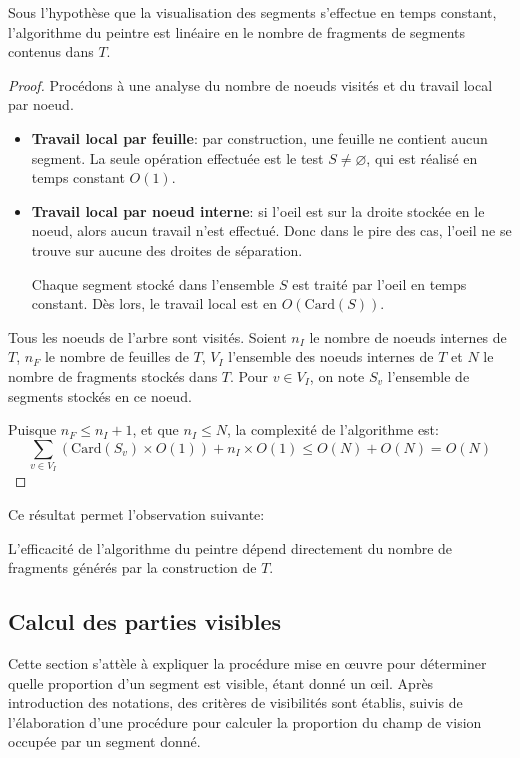 \begin{prop}\label{compl:painter}
  Sous l'hypothèse que la visualisation des segments s'effectue
  en temps constant, l'algorithme du peintre est linéaire en le
  nombre de fragments de segments contenus dans $T$.
\end{prop}
\begin{proof}
  Procédons à une analyse du nombre de noeuds visités et du travail local
  par noeud.
  \begin{itemize}
  \item \textbf{Travail local par feuille}: par construction, une feuille
    ne contient aucun segment. La seule opération effectuée est le test
    $S\neq \varnothing$, qui est réalisé en temps constant $O(1)$.
  \item \textbf{Travail local par noeud interne}: si l'oeil est sur la droite
    stockée en le noeud, alors aucun travail n'est effectué. Donc dans le
    pire des cas, l'oeil ne se trouve sur aucune des droites de séparation.

    Chaque segment stocké dans l'ensemble $S$ est traité par l'oeil en
    temps constant. Dès lors, le travail local est en $O(\mathrm{Card}(S))$.
  \end{itemize}
  Tous les noeuds de l'arbre sont visités. Soient $n_I$ le nombre de noeuds
  internes de $T$, $n_F$ le nombre de feuilles de $T$, $V_I$ l'ensemble des
  noeuds internes de $T$ et $N$ le nombre
  de fragments stockés dans $T$.
  Pour $v\in V_I$, on note $S_v$ l'ensemble de segments stockés en ce noeud.

  Puisque $n_F \leq n_I + 1$, et que $n_I\leq N$,
  la complexité de l'algorithme est:
  $$ \sum_{v\in V_I}\left(\mathrm{Card}(S_v)\times O(1)\right) +
  n_I \times O(1) \leq O(N) + O(N) = O(N)$$
\end{proof}

Ce résultat permet l'observation suivante:
\begin{cor}\label{peintre:cor}
  L'efficacité de l'algorithme du peintre dépend directement
  du nombre de fragments générés par la construction de $T$.
\end{cor}
\subsection{Calcul des parties visibles}\label{not:oeil}
Cette section s'attèle à expliquer la procédure mise en \oe{}uvre pour déterminer
quelle proportion d'un segment est visible, étant donné un \oe{}il.
Après introduction des notations, des critères de visibilités sont
établis, suivis de l'élaboration d'une procédure pour calculer la
proportion du champ de vision occupée par un segment donné.

